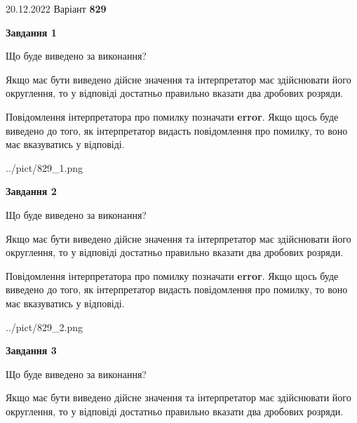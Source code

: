 \documentclass[12pt, ukrainian]{article}
\begin{document}
{20.12.2022 Варіант \No \textbf { 829 }\par}
{
\begin {Large}

{\begin {center}\textbf{Завдання 1}\end {center}}\par
Що буде виведено за виконання? \par

Якщо має бути виведено дійсне значення та інтерпретатор має здійснювати його округлення, 
то у відповіді достатньо правильно вказати два дробових розряди.

Повідомлення інтерпретатора про помилку позначати \textbf{error}.
Якщо щось буде виведено до того, як інтерпретатор видасть повідомлення про помилку, 
то воно має вказуватись у відповіді. \par

\begin{center}
	{../pict/829_1.png}
\end{center}
\newpage

{\begin {center}\textbf{Завдання 2}\end {center}}\par
Що буде виведено за виконання? \par

Якщо має бути виведено дійсне значення та інтерпретатор має здійснювати його округлення, 
то у відповіді достатньо правильно вказати два дробових розряди.

Повідомлення інтерпретатора про помилку позначати \textbf{error}.
Якщо щось буде виведено до того, як інтерпретатор видасть повідомлення про помилку, 
то воно має вказуватись у відповіді. \par

\begin{center}
	{../pict/829_2.png}
\end{center}
\newpage

{\begin {center}\textbf{Завдання 3}\end {center}}\par
Що буде виведено за виконання? \par

Якщо має бути виведено дійсне значення та інтерпретатор має здійснювати його округлення, 
то у відповіді достатньо правильно вказати два дробових розряди.


\end{Large}}
\end{document}
